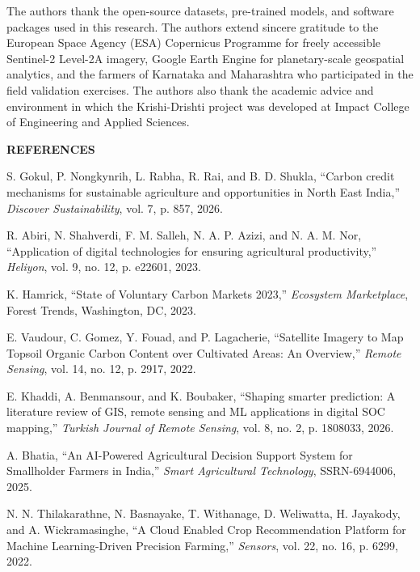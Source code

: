 \documentclass[11pt,a4paper]{article}
\begin{document}
\noindent The authors thank the open-source datasets, pre-trained models, and software packages used in this research. The authors extend sincere gratitude to the European Space Agency (ESA) Copernicus Programme for freely accessible Sentinel-2 Level-2A imagery, Google Earth Engine for planetary-scale geospatial analytics, and the farmers of Karnataka and Maharashtra who participated in the field validation exercises. The authors also thank the academic advice and environment in which the Krishi-Drishti project was developed at Impact College of Engineering and Applied Sciences.
\vspace{1.2em}

\noindent \textbf{\large REFERENCES}
\vspace{0.5em}

\noindent [1] S. Gokul, P. Nongkynrih, L. Rabha, R. Rai, and B. D. Shukla, ``Carbon credit mechanisms for sustainable agriculture and opportunities in North East India,'' \textit{Discover Sustainability}, vol. 7, p. 857, 2026.

\noindent [2] R. Abiri, N. Shahverdi, F. M. Salleh, N. A. P. Azizi, and N. A. M. Nor, ``Application of digital technologies for ensuring agricultural productivity,'' \textit{Heliyon}, vol. 9, no. 12, p. e22601, 2023.

\noindent [3] K. Hamrick, ``State of Voluntary Carbon Markets 2023,'' \textit{Ecosystem Marketplace}, Forest Trends, Washington, DC, 2023.

\noindent [4] E. Vaudour, C. Gomez, Y. Fouad, and P. Lagacherie, ``Satellite Imagery to Map Topsoil Organic Carbon Content over Cultivated Areas: An Overview,'' \textit{Remote Sensing}, vol. 14, no. 12, p. 2917, 2022.

\noindent [5] E. Khaddi, A. Benmansour, and K. Boubaker, ``Shaping smarter prediction: A literature review of GIS, remote sensing and ML applications in digital SOC mapping,'' \textit{Turkish Journal of Remote Sensing}, vol. 8, no. 2, p. 1808033, 2026.

\noindent [6] A. Bhatia, ``An AI-Powered Agricultural Decision Support System for Smallholder Farmers in India,'' \textit{Smart Agricultural Technology}, SSRN-6944006, 2025.

\noindent [7] N. N. Thilakarathne, N. Basnayake, T. Withanage, D. Weliwatta, H. Jayakody, and A. Wickramasinghe, ``A Cloud Enabled Crop Recommendation Platform for Machine Learning-Driven Precision Farming,'' \textit{Sensors}, vol. 22, no. 16, p. 6299, 2022.
\end{document}
